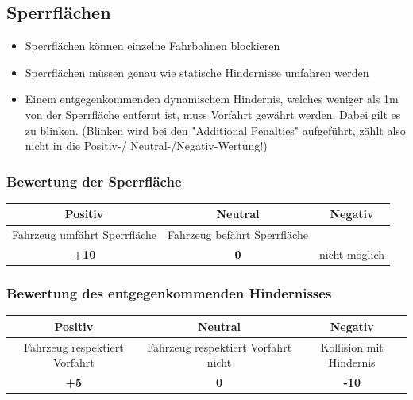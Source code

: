 \documentclass[a4paper, 11pt,usegeometry]{scrartcl}
\begin{document}
\subsection*{Sperrflächen}
\begin{itemize}
  \item Sperrflächen können einzelne Fahrbahnen blockieren
  \item Sperrflächen müssen genau wie statische Hindernisse umfahren werden
  \item Einem entgegenkommenden dynamischem Hindernis, welches weniger als 1m von der Sperrfläche entfernt ist, muss Vorfahrt gewährt werden. Dabei gilt es zu blinken. (Blinken wird bei den "Additional Penalties" aufgeführt, zählt also nicht in die Positiv-/
Neutral-/Negativ-Wertung!)
\end{itemize}

\subsubsection*{Bewertung der Sperrfläche}

\begin{table}[H]
\begin{tabular}{|c|c|c|}
\hline
\rowcolor[HTML]{CACACA} 
\textbf{Positiv} & \textbf{Neutral} & \textbf{Negativ} \\ \hline
Fahrzeug umfährt Sperrfläche & Fahrzeug befährt Sperrfläche &  \\ \hline
\textbf{+10} & \textbf{0} & nicht möglich \\ \hline
\end{tabular}
\end{table}

\subsubsection*{Bewertung des entgegenkommenden Hindernisses}

\begin{table}[H]
\begin{tabular}{|c|c|c|}
\hline
\rowcolor[HTML]{CACACA} 
\textbf{Positiv} & \textbf{Neutral} & \textbf{Negativ} \\ \hline
Fahrzeug respektiert Vorfahrt & Fahrzeug respektiert Vorfahrt nicht & Kollision mit Hindernis \\ \hline
\textbf{+5} & \textbf{0} & \textbf{-10} \\ \hline
\end{tabular}
\end{table}
\end{document}
